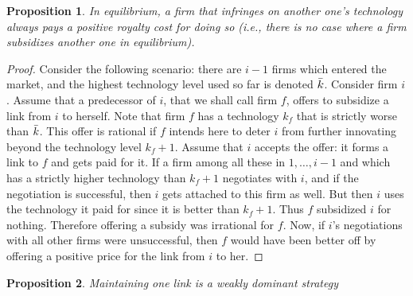 \documentclass{article}
\newtheorem{proposition}{Proposition}
\begin{document}
\begin{proposition}
In equilibrium, a firm that infringes on another one's technology always pays a positive royalty cost for doing so (i.e., there is no case where a firm subsidizes another one in equilibrium).
\end{proposition}
\begin{proof}
Consider the following scenario: there are $i-1$ firms which entered the market, and the highest technology level used so far is denoted $\Bar{k}$. Consider firm $i$. Assume that a predecessor of $i$, that we shall call firm $f$, offers to subsidize a link from $i$ to herself. Note that firm $f$ has a technology $k_f$ that is strictly worse than $\Bar{k}$. This offer is rational if $f$ intends here to deter $i$ from further innovating beyond the technology level $k_f+1$. Assume that $i$ accepts the offer: it forms a link to $f$ and gets paid for it. If a firm among all these in $1,\ldots, i-1$ and which has a strictly higher technology than $k_f+1$ negotiates with $i$, and if the negotiation is successful, then $i$ gets attached to this firm as well. But then $i$ uses the technology it paid for since it is better than $k_f+1$. Thus $f$ subsidized $i$ for nothing. Therefore offering a subsidy was irrational for $f$. Now, if $i$'s negotiations with all other firms were unsuccessful, then $f$ would have been better off by offering a positive price for the link from $i$ to her. 
\end{proof}

\begin{proposition}\label{prop:onelink} 
Maintaining one link is a weakly dominant strategy
\end{proposition}
\end{document}
